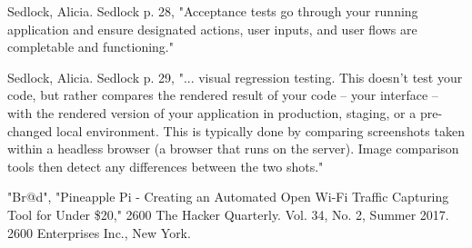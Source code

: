 Sedlock, Alicia. {Sedlock} p. 28, "Acceptance tests go through your running application and ensure designated actions, user inputs, and user flows are completable and functioning."

Sedlock, Alicia. {Sedlock} p. 29, "... visual regression testing. This doesn't test your code, but rather compares the rendered result of your code -- your interface -- with the rendered version of your application in production, staging, or a pre-changed local environment. This is typically done by comparing screenshots taken within a headless browser (a browser that runs on the server). Image comparison tools then detect any differences between the two shots."

"Br@d", "Pineapple Pi - Creating an Automated Open Wi-Fi Traffic Capturing Tool for Under \$20," 2600 The Hacker Quarterly. Vol. 34, No. 2, Summer 2017. 2600 Enterprises Inc., New York.



\markchapterendnotes
